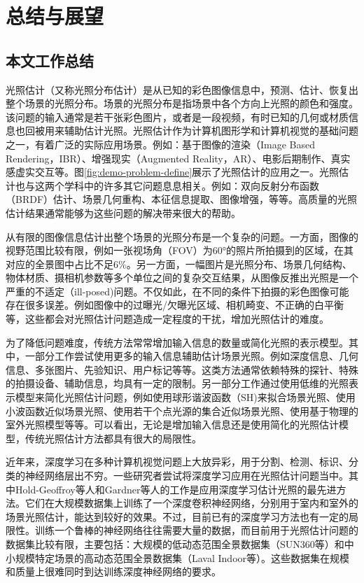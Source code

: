 \chapter{总结与展望}
\section{本文工作总结}
光照估计（又称光照分布估计）是从已知的彩色图像信息中，预测、估计、恢复出整个场景的光照分布。场景的光照分布是指场景中各个方向上光照的颜色和强度。该问题的输入通常是若干张彩色图片，或者是一段视频，有时已知的几何或材质信息也回被用来辅助估计光照。光照估计作为计算机图形学和计算机视觉的基础问题之一，有着广泛的实际应用场景。例如：基于图像的渲染（Image Based Rendering，IBR）、增强现实（Augmented Reality，AR）、电影后期制作、真实感虚实交互等。图\ref{fig:demo-problem-define}展示了光照估计的应用之一。光照估计也与这两个学科中的许多其它问题息息相关。例如：双向反射分布函数（BRDF）估计、场景几何重构、本征信息提取、图像增强，等等。高质量的光照估计结果通常能够为这些问题的解决带来很大的帮助。

从有限的图像信息估计出整个场景的光照分布是一个复杂的问题。一方面，图像的视野范围比较有限，例如一张视场角（FOV）为60°的照片所拍摄到的区域，在其对应的全景图中占比不足6\%。另一方面，一幅图片是光照分布、场景几何结构、物体材质、摄相机参数等多个单位之间的复杂交互结果，从图像反推出光照是一个严重的不适定（ill-posed)问题。不仅如此，在不同的条件下拍摄的彩色图像可能存在很多误差。例如图像中的过曝光/欠曝光区域、相机畸变、不正确的白平衡等，这些都会对光照估计问题造成一定程度的干扰，增加光照估计的难度。

为了降低问题难度，传统方法常常增加输入信息的数量或简化光照的表示模型。其中，一部分工作尝试使用更多的输入信息辅助估计场景光照。例如深度信息、几何信息、多张图片、先验知识、用户标记等等。这类方法通常依赖特殊的探针、特殊的拍摄设备、辅助信息，均具有一定的限制。另一部分工作通过使用低维的光照表示模型来简化光照估计问题，例如使用球形谐波函数（SH)来拟合场景光照、使用小波函数近似场景光照、使用若干个点光源的集合近似场景光照、使用基于物理的室外光照模型等等。可以看出，无论是增加输入信息还是使用简化的光照估计模型，传统光照估计方法都具有很大的局限性。

近年来，深度学习在多种计算机视觉问题上大放异彩，用于分割、检测、标识、分类的神经网络层出不穷。一些研究者尝试将深度学习应用在光照估计问题当中。其中Hold-Geoffroy等人\cite{hold2017deep}和Gardner\cite{gardner2017learning}等人的工作是应用深度学习估计光照的最先进方法。它们在大规模数据集上训练了一个深度卷积神经网络，分别用于室内和室外的场景光照估计，能达到较好的效果。不过，目前已有的深度学习方法也有一定的局限性。训练一个鲁棒的神经网络往往需要大量的数据，而目前用于光照估计问题的数据集比较有限，主要包括：大规模的低动态范围全景数据集（SUN360\cite{xiao2012recognizing}等）和中小规模特定场景的高动态范围全景数据集（Laval Indoor等\cite{gardner2017learning}）。这些数据集在规模和质量上很难同时到达训练深度神经网络的要求。

